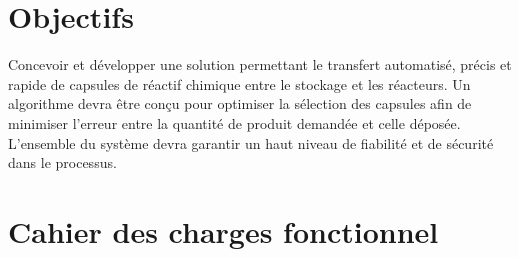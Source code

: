 \section{Objectifs}
Concevoir et développer une solution permettant le transfert automatisé, précis et rapide de capsules de réactif chimique entre le stockage et les réacteurs. Un algorithme devra être conçu pour optimiser la sélection des capsules afin de minimiser l'erreur entre la quantité de produit demandée et celle déposée. L'ensemble du système devra garantir un haut niveau de fiabilité et de sécurité dans le processus.
\section{Cahier des charges fonctionnel}
